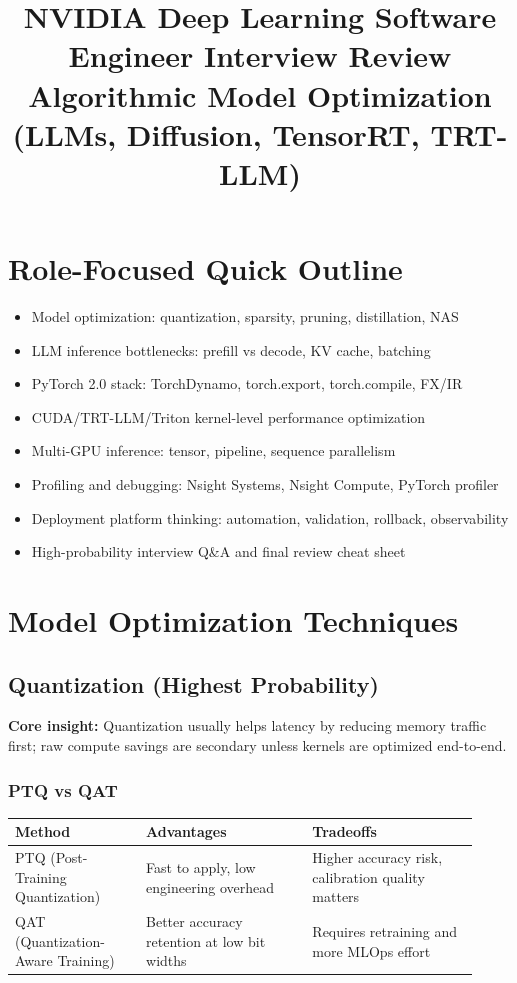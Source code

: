 \documentclass[11pt]{article}
\title{\textbf{NVIDIA Deep Learning Software Engineer Interview Review}\\
Algorithmic Model Optimization (LLMs, Diffusion, TensorRT, TRT-LLM)}
\author{}
\date{}
\begin{document}
\maketitle
\renewcommand{\arraystretch}{1.2}

\section*{Role-Focused Quick Outline}
\begin{itemize}[leftmargin=*]
\item Model optimization: quantization, sparsity, pruning, distillation, NAS
\item LLM inference bottlenecks: prefill vs decode, KV cache, batching
\item PyTorch 2.0 stack: TorchDynamo, torch.export, torch.compile, FX/IR
\item CUDA/TRT-LLM/Triton kernel-level performance optimization
\item Multi-GPU inference: tensor, pipeline, sequence parallelism
\item Profiling and debugging: Nsight Systems, Nsight Compute, PyTorch profiler
\item Deployment platform thinking: automation, validation, rollback, observability
\item High-probability interview Q\&A and final review cheat sheet
\end{itemize}

\section{Model Optimization Techniques}

\subsection{Quantization (Highest Probability)}
\begin{tcolorbox}[colback=secondary]
\textbf{Core insight:} Quantization usually helps latency by reducing memory traffic first; raw compute savings are secondary unless kernels are optimized end-to-end.
\end{tcolorbox}

\subsubsection*{PTQ vs QAT}
\begin{center}
\begin{tabular}{|p{0.26\linewidth}|p{0.33\linewidth}|p{0.33\linewidth}|}
\hline
\textbf{Method} & \textbf{Advantages} & \textbf{Tradeoffs} \\
\hline
PTQ (Post-Training Quantization) & Fast to apply, low engineering overhead & Higher accuracy risk, calibration quality matters \\
\hline
QAT (Quantization-Aware Training) & Better accuracy retention at low bit widths & Requires retraining and more MLOps effort \\
\hline
\end{tabular}
\end{center}
\end{document}
